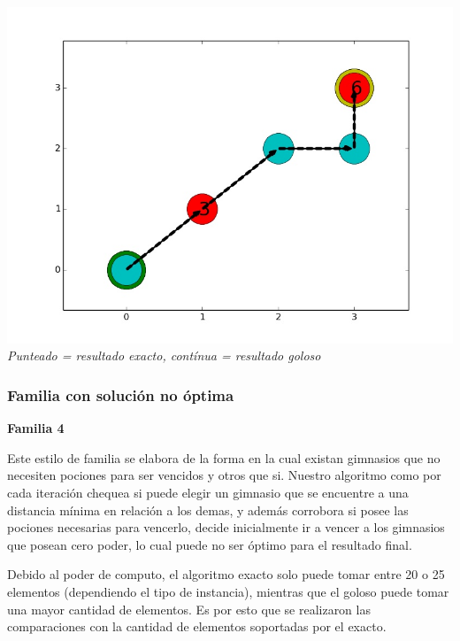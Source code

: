 \vspace*{0.3cm} \vspace*{0.3cm}
  \begin{center}
\includegraphics[scale=0.30]{./EJ2/optima.jpeg}
\\{\textit{Punteado = resultado exacto, contínua = resultado goloso}}
  \end{center}
  \vspace*{0.3cm}

\subsubsection*{Familia con soluci\'on no \'optima}

\begin{center}
\textbf{Familia 4}
\end{center}

Este estilo de familia se elabora de la forma en la cual existan gimnasios que no necesiten pociones para ser vencidos y otros que si. Nuestro algoritmo como por cada iteraci\'on chequea si puede elegir un gimnasio que se encuentre a una distancia m\'inima en relaci\'on a los demas, y adem\'as corrobora si posee las pociones necesarias para vencerlo, decide inicialmente ir a vencer a los gimnasios que posean cero poder, lo cual puede no ser \'optimo para el resultado final.

Debido al poder de computo, el algoritmo exacto solo puede tomar entre 20 o 25 elementos (dependiendo el tipo de instancia), mientras que el goloso puede tomar una mayor cantidad de elementos. Es por esto que se realizaron las comparaciones con la cantidad de elementos soportadas por el exacto.

